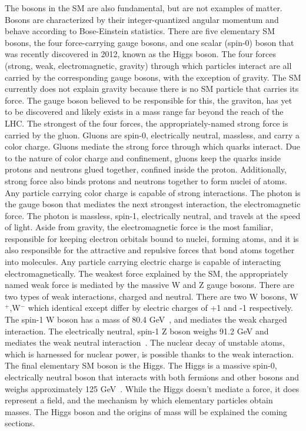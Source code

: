 The bosons in the SM are also fundamental, but are not examples of matter. Bosons are characterized by their integer-quantized angular momentum and behave according to Bose-Einstein statistics. There are five elementary SM bosons, the four force-carrying gauge
bosons, and one scalar (spin-0) boson that was recently discovered in 2012, known as the Higgs boson. The four forces (strong, weak, electromagnetic, gravity) through which particles interact are all carried by the corresponding gauge bosons, with the exception
of gravity. The SM currently does not explain gravity because there is no SM particle that carries its force. The gauge boson believed to be responsible for this, the graviton, has yet to be discovered and likely exists in a mass range far beyond the reach of
the LHC. The strongest of the four forces, the appropriately-named strong force is carried by the gluon. Gluons are spin-0, electrically neutral, massless, and carry a color charge. Gluons mediate the strong force through which quarks interact. Due to the nature of
color charge and confinement, gluons keep the quarks inside protons and neutrons glued together, confined inside the proton. Additionally, strong force also binds protons and neutrons together to form nuclei of atoms. Any particle carrying color charge is capable
of strong interactions. 
The photon is the gauge boson that mediates the next strongest interaction, the electromagnetic force. The photon is massless, spin-1, electrically neutral, and travels at the speed of light. Aside from gravity, the electromagnetic force is the most familiar,
responsible for keeping electron orbitals bound to nuclei, forming atoms, and it is also responsible for the attractive and repulsive forces that bond atoms together into molecules. Any particle carrying electric charge is capable of interacting electromagnetically.
The weakest force explained by the SM, the appropriately named weak force is mediated by the massive W and Z gauge bosons. There are two types of weak interactions, charged and neutral.
There are two W bosons, W$^+$,W$^-$ which identical except differ by electric charges of +1 and -1 respectively. The spin-1 W boson has a mass of 80.4 GeV~\cite{pdg}, and mediates the weak charged interaction.
The electrically neutral, spin-1 Z boson weighs 91.2 GeV and mediates the weak neutral interaction~\cite{pdg}. The nuclear decay of unstable atoms, which is harnessed for nuclear power, is possible thanks to the weak interaction.
The final elementary SM boson is the Higgs. The Higgs is a massive spin-0, electrically neutral boson that interacts with both fermions and other bosons and weighs approximately 125 GeV~\cite{pdg}. While the Higgs doesn't mediate a force, it does represent a field, and the
mechanism by which elementary particles obtain masses. The Higgs boson and the origins of mass will be explained the coming sections. 

